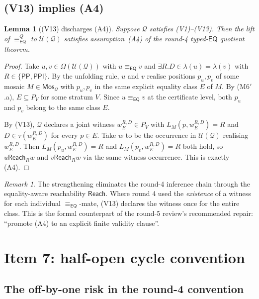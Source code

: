 \documentclass[11pt]{article}
\newtheorem{lemma}[theorem]{Lemma}
\theoremstyle{definition}
\theoremstyle{remark}
\newtheorem{remark}[theorem]{Remark}
\newcommand{\PP}{\mathsf{PP}}
\newcommand{\PPI}{\mathsf{PPI}}
\newcommand{\EQ}{\mathsf{EQ}}
\newcommand{\Mos}{\mathsf{Mos}}
\newcommand{\Reach}{\mathsf{Reach}}
\newcommand{\Q}{\mathcal{Q}}
\newcommand{\U}{\mathcal{U}}
\newcommand{\eqc}{\equiv_{\EQ}}
\begin{document}
\subsection{(V13) implies (A4)}

\begin{lemma}[(V13) discharges (A4)]\label{lem:V13-implies-A4}
Suppose $\Q$ satisfies (V1)--(V13).  Then the lift of $\eqc^Q$ to
$\U(\Q)$ satisfies assumption~(A4) of the round-4 typed-$\EQ$
quotient theorem.
\end{lemma}

\begin{proof}
Take $u,v\in\Omega(\U(\Q))$ with $u\eqc v$ and
$\exists R.D\in\lambda(u)=\lambda(v)$ with $R\in\{\PP,\PPI\}$.  By
the unfolding rule, $u$ and $v$ realise positions $p_u,p_v$ of some
mosaic $M\in\Mos_\Q$ with $p_u,p_v$ in the same explicit equality
class $E$ of $M$.  By (M6$'$.a), $E\subseteq P_V$ for some
stratum $V$.  Since $u\eqc v$ at the certificate level, both
$p_u$ and $p_v$ belong to the same class $E$.

By (V13), $\Q$ declares a joint witness $w_E^{R,D}\in P_V$ with
$L_M(p,w_E^{R,D})=R$ and $D\in\tau(w_E^{R,D})$ for every $p\in E$.
Take $w$ to be the occurrence in $\U(\Q)$ realising
$w_E^{R,D}$.  Then $L_M(p_u,w_E^{R,D})=R$ and
$L_M(p_v,w_E^{R,D})=R$ both hold, so $u\Reach_R w$ and
$v\Reach_R w$ via the same witness occurrence.  This is exactly
(A4).
\end{proof}

\begin{remark}
The strengthening eliminates the round-4 inference chain through
the equality-aware reachability $\Reach$.  Where round 4 used the
\emph{existence} of a witness for each individual $\eqc$-mate, (V13)
declares the witness once for the entire class.  This is the
formal counterpart of the round-5 review's recommended repair:
``promote (A4) to an explicit finite validity clause''.
\end{remark}

\section{Item 7: half-open cycle convention}
\label{sec:item7}

\subsection{The off-by-one risk in the round-4 convention}
\end{document}
